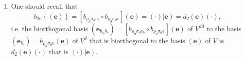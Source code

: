 \documentclass[aps,preprint]{revtex4}
\begin{document}
\begin{enumerate}
\begin{enumerate}
\begin{equation}
\begin{array}{c}
\left( e_{1}\right\vert _{\rho _{d}\sigma _{d}} \\ 
\vdots \\ 
\left( e_{r}\right\vert _{\rho _{d}\sigma _{d}}%
\end{array}%
\right) \right]
\end{equation}%
and double dual vectors by 
\begin{equation}
v_{d_{e}d_{e}}=d_{2}\left( v\right) \overset{\Delta }{=}\left[ \left( 
\begin{array}{ccc}
\left\vert e_{1}\right) & \cdots & \left\vert e_{r}\right)%
\end{array}%
\right) \right] \left( 
\begin{array}{c}
\mathcal{R}_{e}\left( v\right) _{1} \\ 
\vdots \\ 
\mathcal{R}_{e}\left( v\right) _{r}%
\end{array}%
\right) =\left[ \left( 
\begin{array}{ccc}
\left\vert e_{1}\right) & \cdots & \left\vert e_{r}\right)%
\end{array}%
\right) \right] \left( 
\begin{array}{c}
\mathcal{R}_{e}\left( v\right) _{1} \\ 
\vdots \\ 
\mathcal{R}_{e}\left( v\right) _{r}%
\end{array}%
\right) .
\end{equation}

\item One should recall that 
\begin{equation}
b_{2e}\left\{ \left( \boldsymbol{e}\right) \right\} =\left[ b_{\rho
_{d}\sigma _{d}e_{b}}\circ b_{\rho _{d}\sigma _{d}e}\right] \left( 
\boldsymbol{e}\right) =\left( \cdot \right) \left\vert \boldsymbol{e}\right)
=d_{2}\left( \boldsymbol{e}\right) \left( \cdot \right) ,
\end{equation}%
i.e. the biorthogonal basis $\left( \boldsymbol{e}_{b_{e_{b}}b_{e}}\right) =%
\left[ b_{\rho _{d}\sigma _{d}e_{b}}\circ b_{\rho _{d}\sigma _{d}e}\right]
\left( \boldsymbol{e}\right) $ of $V^{dd}$ to the basis $\left( \boldsymbol{e%
}_{b_{e}}\right) =b_{\rho _{d}\sigma _{d}e}\left( \boldsymbol{e}\right) $ of 
$V^{d}$ that is biorthogonal to the basis $\left( \boldsymbol{e}\right) $ of 
$V$ is $d_{2}\left( \boldsymbol{e}\right) \left( \cdot \right) $ that is $%
\left( \cdot \right) \left\vert \boldsymbol{e}\right) .$


\end{enumerate}
\end{enumerate}
\end{document}

